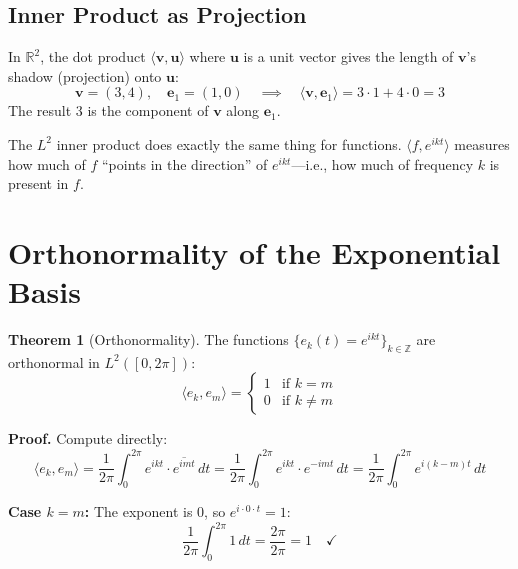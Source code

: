 \documentclass[11pt,a4paper]{article}
\theoremstyle{definition}
\newtheorem{theorem}{Theorem}[section]
\begin{document}
\subsection{Inner Product as Projection}

In $\mathbb{R}^2$, the dot product $\langle \mathbf{v}, \mathbf{u} \rangle$ where $\mathbf{u}$ is a unit vector gives the length of $\mathbf{v}$'s shadow (projection) onto $\mathbf{u}$:
\begin{equation}
    \mathbf{v} = (3, 4), \quad \mathbf{e}_1 = (1, 0) \quad\implies\quad \langle \mathbf{v}, \mathbf{e}_1 \rangle = 3 \cdot 1 + 4 \cdot 0 = 3
\end{equation}
The result $3$ is the component of $\mathbf{v}$ along $\mathbf{e}_1$.

The $L^2$ inner product does exactly the same thing for functions. $\langle f, e^{ikt} \rangle$ measures how much of $f$ ``points in the direction'' of $e^{ikt}$---i.e., how much of frequency $k$ is present in $f$.

\section{Orthonormality of the Exponential Basis}

\begin{theorem}[Orthonormality]
The functions $\{e_k(t) = e^{ikt}\}_{k \in \mathbb{Z}}$ are orthonormal in $L^2([0, 2\pi])$:
\begin{equation}
    \langle e_k, e_m \rangle = \begin{cases} 1 & \text{if } k = m \\ 0 & \text{if } k \neq m \end{cases}
\end{equation}
\end{theorem}

\textbf{Proof.} Compute directly:
\begin{equation}
    \langle e_k, e_m \rangle = \frac{1}{2\pi} \int_0^{2\pi} e^{ikt} \cdot \overline{e^{imt}} \, dt = \frac{1}{2\pi} \int_0^{2\pi} e^{ikt} \cdot e^{-imt} \, dt = \frac{1}{2\pi} \int_0^{2\pi} e^{i(k-m)t} \, dt
\end{equation}

\textbf{Case $k = m$:} The exponent is $0$, so $e^{i \cdot 0 \cdot t} = 1$:
\begin{equation}
    \frac{1}{2\pi} \int_0^{2\pi} 1 \, dt = \frac{2\pi}{2\pi} = 1 \quad\checkmark
\end{equation}
\end{document}

